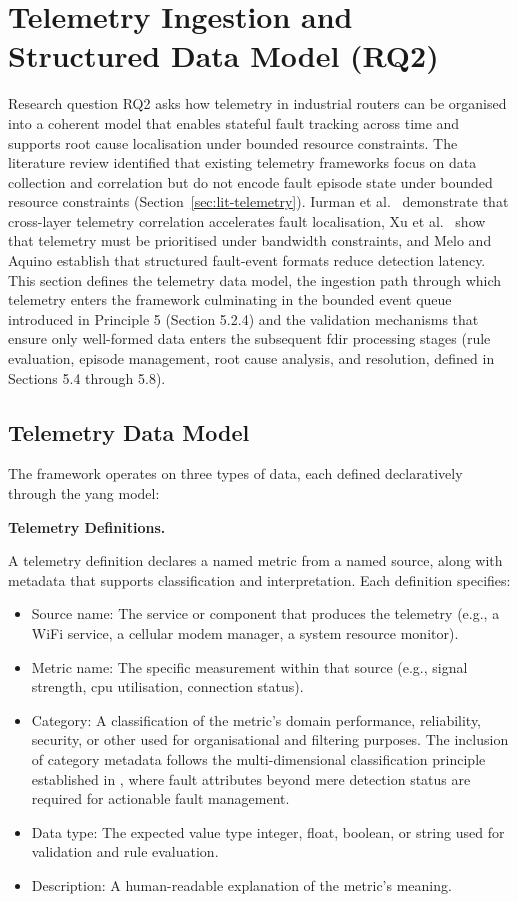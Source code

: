 \section{Telemetry Ingestion and Structured Data Model (RQ2)}\label{sec:telemetry-model}

Research question RQ2 asks how telemetry in industrial routers can be organised into a coherent model that enables stateful fault tracking across time and supports root cause localisation under bounded resource constraints. The literature review identified that existing telemetry frameworks focus on data collection and correlation but do not encode fault episode state under bounded resource constraints (Section~\ref{sec:lit-telemetry}). Iurman et al.\ \cite{ref13} demonstrate that cross-layer telemetry correlation accelerates fault localisation, Xu et al.\ \cite{ref14} show that telemetry must be prioritised under bandwidth constraints, and Melo and Aquino \cite{ref15} establish that structured fault-event formats reduce detection latency. This section defines the telemetry data model, the ingestion path through which telemetry enters the framework culminating in the bounded event queue introduced in Principle 5 (Section 5.2.4) and the validation mechanisms that ensure only well-formed data enters the subsequent \gls{fdir} processing stages (rule evaluation, episode management, root cause analysis, and resolution, defined in Sections 5.4 through 5.8).

\subsection{Telemetry Data Model}\label{sec:telemetry-data-model}

The framework operates on three types of data, each defined declaratively through the \gls{yang} model:

\textbf{Telemetry Definitions.}

A telemetry definition declares a named metric from a named source, along with metadata that supports classification and interpretation. Each definition specifies:

\begin{itemize}
\item Source name: The service or component that produces the telemetry (e.g., a WiFi service, a cellular modem manager, a system resource monitor).
\item Metric name: The specific measurement within that source (e.g., signal strength, \gls{cpu} utilisation, connection status).
\item Category: A classification of the metric's domain performance, reliability, security, or other used for organisational and filtering purposes. The inclusion of category metadata follows the multi-dimensional classification principle established in \cite{ref1,ref3}, where fault attributes beyond mere detection status are required for actionable fault management.
\item Data type: The expected value type integer, float, boolean, or string used for validation and rule evaluation.
\item Description: A human-readable explanation of the metric's meaning.
\end{itemize}

